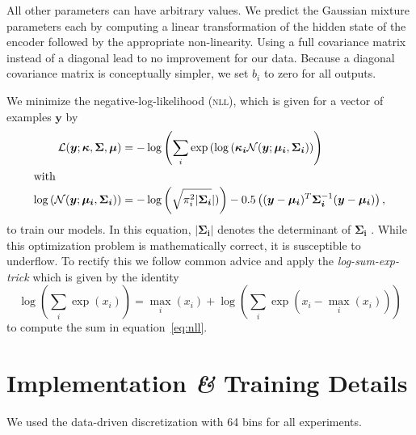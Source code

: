 \documentclass[nobib, a4paper]{tufte-handout}
\begin{document}
All other parameters can have arbitrary values.
We predict the Gaussian mixture parameters each by computing a linear transformation of the hidden state of the encoder followed by the appropriate non-linearity.
Using a full covariance matrix instead of a diagonal lead to no improvement for our data.
Because a diagonal covariance matrix is conceptually simpler, we set \(b_i\) to zero for all outputs.%

We minimize the negative-log-likelihood (\textsc{nll}), which is given for a vector of examples \(\bm{y}\) by
\begin{align}
  \label{eq:nll}
 \mathcal{L} (\bm{y}; \bm{\kappa}, \bm{\Sigma}, \bm{\mu}) &= - \log \left(  \sum_i \exp \left(  \log \left( \bm{\kappa_i} \mathcal{N} (\bm{y}; \bm{\mu_i}, \bm{\Sigma_i} \right) \right) \right) \\ 
  \intertext{with}
  \log \left( \mathcal{N} (\bm{y}; \bm{\mu_i}, \bm{\Sigma_i}) \right) &= 
 -\log \left( \sqrt{\pi_i^2 \vert \bm{\Sigma_i}} \vert)  \right) - 0.5 \left( (\bm{y} - \bm{\mu_i})^T \bm{\Sigma_i}^{-1} (\bm{y} - \bm{\mu_i}) \right),\nonumber
\end{align}
to train our models.
In this equation, \(\vert \bm{\Sigma_i} \vert\) denotes the determinant of \(\bm{\Sigma_i}\)%
.
While this optimization problem is mathematically correct, it is susceptible to underflow.
To rectify this we follow common advice and apply the \textit{log-sum-exp-trick} which is given by the identity
\begin{equation*}
  \log \left( \sum_i \exp (x_i) \right) = \max_i (x_i) + \log \left( \sum_i \exp (x_i - \max_i (x_i)) \right)
\end{equation*}
to compute the sum in equation~\ref{eq:nll}\autocite{mdnMaster}.

\section{Implementation \textit{\&} Training Details}
We used the data-driven discretization with 64 bins for all experiments.
\end{document}
